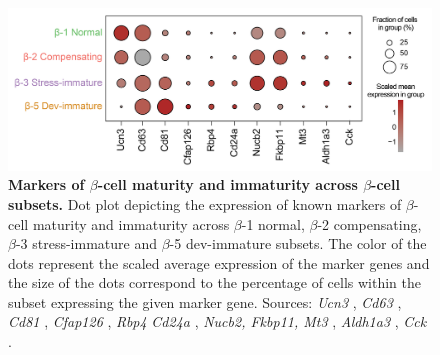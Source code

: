 


\begin{figure}[t]
    \centering
    \includegraphics[width=\linewidth]{Chapter6/Fig/F3-23-01.png}
    \caption[Markers of $\beta$-cell maturity and immaturity across $\beta$-cell subsets]{\textbf{Markers of $\beta$-cell maturity and immaturity across $\beta$-cell subsets.} Dot plot depicting the expression of known markers of $\beta$-cell maturity and immaturity across $\beta$-1 normal, $\beta$-2 compensating, $\beta$-3 stress-immature and $\beta$-5 dev-immature subsets. The color of the dots represent the scaled average expression of the marker genes and the size of the dots correspond to the percentage of cells within the subset expressing the given marker gene. Sources: \textit{Ucn3} \textbf{\cite{blum_functional_2012}}, \textit{Cd63} \textbf{\cite{rubio-navarro_beta_2023}}, \textit{Cd81} \textbf{\cite{salinno_cd81_2021}}, \textit{Cfap126} \textbf{\cite{bader_identification_2016}}, \textit{Rbp4} \textbf{\cite{camunas-soler_patch-seq_2020}} \textit{Cd24a} \textbf{\cite{dror_epigenetic_2023}}, \textit{Nucb2, Fkbp11, Mt3}  \textbf{\cite{hrovatin_delineating_2023}}, \textit{Aldh1a3} \textbf{\cite{hrovatin_delineating_2023,kim-muller_aldehyde_2016,cinti_evidence_2016}}, \textit{Cck} \textbf{\cite{sachs_targeted_2020,chung_endocrine-exocrine_2020}}.}
    \label{fig:chp6_betacellmarkers}
\end{figure}

